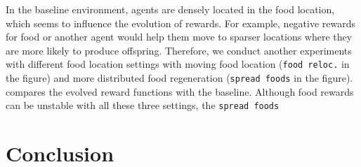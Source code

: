 In the baseline environment, agents are densely located in the food location, which seems to influence the evolution of rewards. For example, negative rewards for food or another agent would help them move to sparser locations where they are more likely to produce offspring. Therefore, we conduct another experiments with different food location settings with moving food location (\texttt{food reloc.} in the figure) and more distributed food regeneration (\texttt{spread foods} in the figure).  compares the evolved reward functions with the baseline. Although food rewards can be unstable with all these three settings, the \texttt{spread foods}

\section{Conclusion}